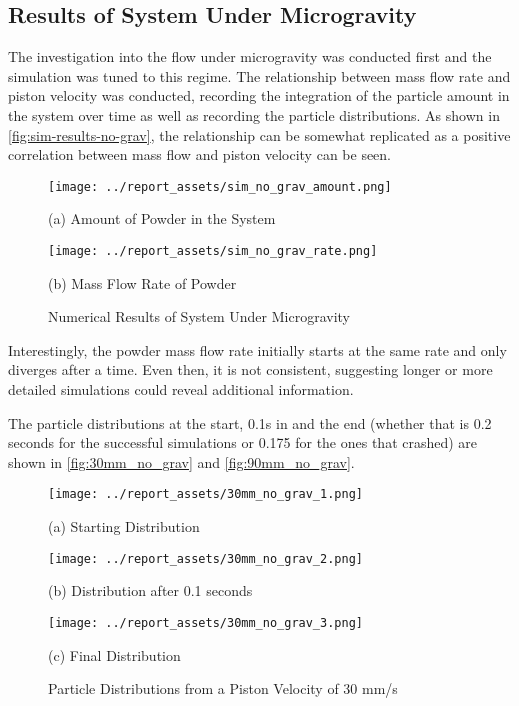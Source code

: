 \subsection{Results of System Under Microgravity}
The investigation into the flow under microgravity was conducted first and the simulation was tuned to this regime. The relationship between mass flow rate and piston velocity was conducted, recording the integration of the particle amount in the system over time as well as recording the particle distributions. As shown in \autoref{fig:sim-results-no-grav}, the relationship can be somewhat replicated as a positive correlation between mass flow and piston velocity can be seen.
\begin{figure}[htbp]
    \centering

    \begin{minipage}{0.45\textwidth}
        \centering
        \texttt{[image: ../report\_assets/sim\_no\_grav\_amount.png]}
        \caption*{(a) Amount of Powder in the System}
    \end{minipage}    
    \hfill
    \begin{minipage}{0.45\textwidth}
        \centering
        \texttt{[image: ../report\_assets/sim\_no\_grav\_rate.png]}
        \caption*{(b) Mass Flow Rate of Powder}
    \end{minipage}    
    \caption{Numerical Results of System Under Microgravity}\label{fig:sim-results-no-grav}

\end{figure} 
Interestingly, the powder mass flow rate initially starts at the same rate and only diverges after a time. Even then, it is not consistent, suggesting longer or more detailed simulations could reveal additional information.

The particle distributions at the start, 0.1s in and the end (whether that is 0.2 seconds for the successful simulations or 0.175 for the ones that crashed) are shown in \autoref{fig:30mm_no_grav} and \autoref{fig:90mm_no_grav}.
\begin{figure}[htbp]
    \centering

    \begin{minipage}{0.32\textwidth}
        \centering
        \texttt{[image: ../report\_assets/30mm\_no\_grav\_1.png]}
        \caption*{(a) Starting Distribution}
    \end{minipage}
    \hfill
    \begin{minipage}{0.32\textwidth}
        \centering
        \texttt{[image: ../report\_assets/30mm\_no\_grav\_2.png]}
        \caption*{(b) Distribution after 0.1 seconds}
    \end{minipage}
    \hfill
    \begin{minipage}{0.32\textwidth}
        \centering
        \texttt{[image: ../report\_assets/30mm\_no\_grav\_3.png]}
        \caption*{(c) Final Distribution}
    \end{minipage}
    \caption{Particle Distributions from a Piston Velocity of 30 mm/s}

\end{figure}\label{fig:30mm_no_grav}

